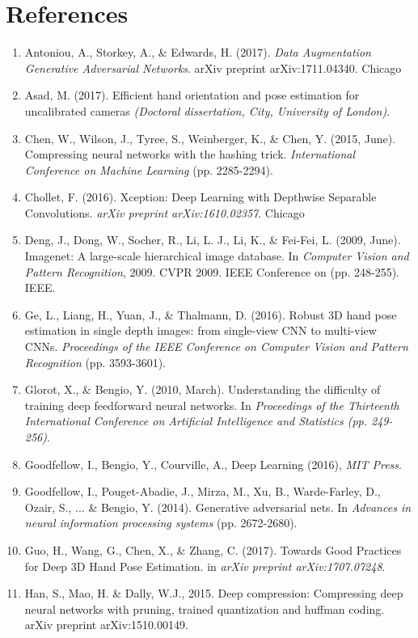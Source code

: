 \documentclass{article}
\begin{document}
\section*{References}
\begin{enumerate}
\item Antoniou, A., Storkey, A., \& Edwards, H. (2017).
 \emph{Data Augmentation Generative Adversarial Networks}. arXiv preprint arXiv:1711.04340.
Chicago	
\item Asad, M. (2017). Efficient hand orientation and pose estimation for uncalibrated cameras \emph{(Doctoral dissertation, City, University of London)}.
\item Chen, W., Wilson, J., Tyree, S., Weinberger, K., \& Chen, Y. (2015, June). Compressing neural networks with the hashing trick. \emph{International Conference on Machine Learning} (pp. 2285-2294).
\item Chollet, F. (2016). Xception: Deep Learning with Depthwise Separable Convolutions. \emph{arXiv preprint arXiv:1610.02357}.
Chicago	
\item Deng, J., Dong, W., Socher, R., Li, L. J., Li, K., \& Fei-Fei, L. (2009, June). Imagenet: A large-scale hierarchical image database. In \emph{Computer Vision and Pattern Recognition}, 2009. CVPR 2009. IEEE Conference on (pp. 248-255). IEEE.
\item Ge, L., Liang, H., Yuan, J., \& Thalmann, D. (2016). Robust 3D hand pose estimation in single depth images: from single-view CNN to multi-view CNNs. \emph{Proceedings of the IEEE Conference on Computer Vision and Pattern Recognition} (pp. 3593-3601).
\item Glorot, X., \& Bengio, Y. (2010, March). Understanding the difficulty of training deep feedforward neural networks. In \emph{ Proceedings of the Thirteenth International Conference on Artificial Intelligence and Statistics (pp. 249-256)}.
\item Goodfellow, I., Bengio, Y., Courville, A., Deep Learning (2016), \emph{MIT Press}.
\item Goodfellow, I., Pouget-Abadie, J., Mirza, M., Xu, B., Warde-Farley, D., Ozair, S., ... \& Bengio, Y. (2014). Generative adversarial nets. In \emph{Advances in neural information processing systems} (pp. 2672-2680).
\item Guo, H., Wang, G., Chen, X., \& Zhang, C. (2017). Towards Good Practices for Deep 3D Hand Pose Estimation. in \emph{arXiv preprint arXiv:1707.07248}.
\item Han, S., Mao, H. \& Dally, W.J., 2015. Deep compression: Compressing deep neural networks with pruning, trained quantization and huffman coding. arXiv preprint arXiv:1510.00149.

\end{enumerate}
\end{document}
